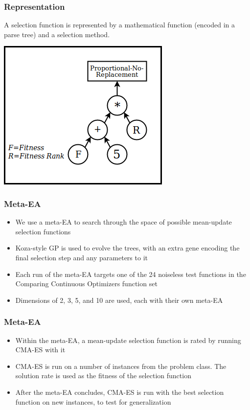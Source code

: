 \documentclass{beamer}
\begin{document}
	\begin{frame}
		\frametitle{Representation}
		A selection function is represented by a mathematical function (encoded in a parse tree) and a selection method.
		\begin{center}
			\includegraphics[height=0.6\textheight]{example_eppsea_nolabel}
		\end{center}
	\end{frame}
	
	\begin{frame}
		\frametitle{Meta-EA}
		
		\begin{itemize}
			 \item<1-|alert@1> We use a meta-EA to search through the space of possible mean-update selection functions
			 \item<2-|alert@2> Koza-style GP is used to evolve the trees, with an extra gene encoding the final selection step and any parameters to it	 
			 \item<3-|alert@3> Each run of the meta-EA targets one of the 24 noiseless test functions in the Comparing Continuous Optimizers function set
 			 \item<4-|alert@4> Dimensions of 2, 3, 5, and 10 are used, each with their own meta-EA
		\end{itemize}
	\end{frame}

	\begin{frame}
		\frametitle{Meta-EA}
		
		\begin{itemize}
			\item<1-|alert@1> Within the meta-EA, a mean-update selection function is rated by running CMA-ES with it
			\item<2-|alert@2> CMA-ES is run on a number of instances from the problem class. The solution rate is used as the fitness of the selection function
			\item<3-|alert@3> After the meta-EA concludes, CMA-ES is run with the best selection function on new instances, to test for generalization
		\end{itemize}
	\end{frame}
\end{document}
